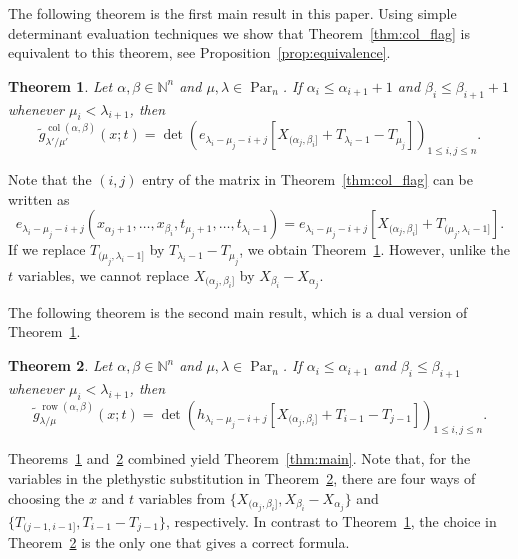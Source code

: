 \documentclass[12pt]{amsart}
\numberwithin{equation}{section}
\newtheorem{thm}{Theorem}[section]
\theoremstyle{definition}
\newcommand\wg{\widetilde{g}}
\newcommand\col{\operatorname{col}}
\newcommand\row{\operatorname{row}}
\newcommand\NN{\mathbb{N}}
\newcommand\Par{\operatorname{Par}}
\begin{document}
The following theorem is the first main result in this paper. Using simple
determinant evaluation techniques we show that Theorem~\ref{thm:col_flag} is
equivalent to this theorem, see Proposition~\ref{prop:equivalence}.


\begin{thm} \label{thm:col_flag2}
  Let $\alpha,\beta\in\NN^n$ and $\mu,\lambda\in\Par_n$. 
If $\alpha_i\le \alpha_{i+1}+1$ and $\beta_i\le \beta_{i+1}+1$ whenever
$\mu_i<\lambda_{i+1}$, then
  \[
  \wg_{\lambda'/\mu'}^{\col(\alpha,\beta)}(x;t) = \det \left(
    e_{\lambda_i-\mu_j-i+j}[X_{(\alpha_j,\beta_i]}+T_{\lambda_i-1}-T_{\mu_j}]
  \right)_{1\le i,j\le n}.
\]
\end{thm}

Note that the $(i,j)$ entry of the matrix in Theorem~\ref{thm:col_flag} 
can be written as
\[
e_{\lambda_i-\mu_j-i+j}(x_{\alpha_j+1},\dots, x_{\beta_i},t_{\mu_j+1},\dots,t_{\lambda_i-1})
= e_{\lambda_i-\mu_j-i+j}[X_{(\alpha_j,\beta_i]}+T_{(\mu_j,\lambda_i-1]}].
\]
If we replace $T_{(\mu_j,\lambda_i-1]}$ by $T_{\lambda_i-1}-T_{\mu_j}$, we
obtain Theorem~\ref{thm:col_flag2}. However, unlike the $t$ variables, we cannot
replace $X_{(\alpha_j,\beta_i]}$ by $X_{\beta_i}-X_{\alpha_j}$. 


The following theorem is the second main result, which is a dual version of
Theorem~\ref{thm:col_flag2}.



\begin{thm}\label{thm:row_flag}
  Let $\alpha,\beta\in\NN^n$ and $\mu,\lambda\in\Par_n$. 
If $\alpha_i\le \alpha_{i+1}$ and $\beta_i\le \beta_{i+1}$ whenever
$\mu_i<\lambda_{i+1}$, then
\[
\wg_{\lambda/\mu}^{\row(\alpha,\beta)}(x;t) = \det \left(
      h_{\lambda_i-\mu_j-i+j}[X_{(\alpha_j,\beta_i]}+T_{i-1}-T_{j-1}]
      \right)_{1\le i,j\le n}.
\]
\end{thm}

Theorems~\ref{thm:col_flag2} and~\ref{thm:row_flag} combined yield
Theorem~\ref{thm:main}. Note that, for the variables in the plethystic
substitution in Theorem~\ref{thm:row_flag}, there are four ways of choosing the
$x$ and $t$ variables from $\{X_{(\alpha_j,\beta_i]},X_{\beta_i}-X_{\alpha_j}\}$
and $\{T_{(j-1,i-1]},T_{i-1}-T_{j-1}\}$, respectively. In contrast to
Theorem~\ref{thm:col_flag2}, the choice in Theorem~\ref{thm:row_flag} is the
only one that gives a correct formula.
\end{document}
